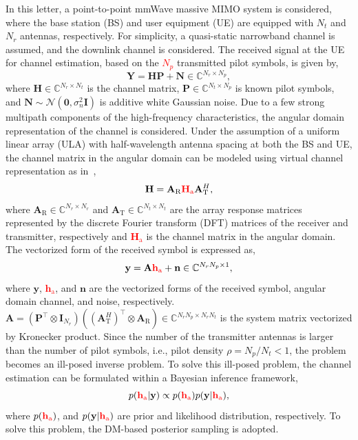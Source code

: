 \documentclass[lettersize,journal]{IEEEtran}
\newcommand{\tred}{\textcolor{red}}
\begin{document}
In this letter, a point-to-point mmWave massive MIMO system is considered, where the base station (BS) and user equipment (UE) are equipped with $N_{t}$ and $N_{r}$ antennas, respectively. For simplicity, a quasi-static narrowband channel is assumed, and the downlink channel is considered. The received signal at the UE for channel estimation, based on the \tred{$N_{p}$} transmitted pilot symbols, is given by,
\begin{equation}
\mathbf{Y}=\mathbf{H}\mathbf{P}+\mathbf{N}\in \mathbb{C}^{N_{r}\times N_{p}},
\end{equation}
where $\mathbf{H}\in \mathbb{C}^{N_{r}\times N_{t}}$ is the channel matrix, $\mathbf{P}\in \mathbb{C}^{N_{t}\times N_{p}}$ is known pilot symbols, and $\mathbf{N}\sim\mathcal{N}(\mathbf{0},\sigma^{2}_{n}\mathbf{I})$ is additive white Gaussian noise. Due to a few strong multipath components of the high-frequency characteristics, the angular domain representation of the channel is considered. Under the assumption of a uniform linear array (ULA) with half-wavelength antenna spacing at both the BS and UE, the channel matrix in the angular domain can be modeled using virtual channel representation as in~\cite{sayeedDeconstructingMultiantennaFading2002},
\begin{equation}
\mathbf{H} = \mathbf{A}_{\text{R}}\tred{\mathbf{H}_{\text{a}}}\mathbf{A}_{\text{T}}^{H},
\end{equation}
where $\mathbf{A}_{\text{R}}\in \mathbb{C}^{N_{r}\times N_{r}}$ and $\mathbf{A}_{\text{T}}\in \mathbb{C}^{N_{t}\times N_{t}}$ are the array response matrices represented by the discrete Fourier transform (DFT) matrices of the receiver and transmitter, respectively and \tred{$\mathbf{H}_{\text{a}}$ }is the channel matrix in the angular domain.
The vectorized form of the received symbol is expressed as,
\begin{equation}
\mathbf{y} = \mathbf{A}\tred{\mathbf{h}_{\text{a}}}+\mathbf{n}\in \mathbb{C}^{N_{r}N_{p}\times 1},
\end{equation}
where $\mathbf{y}$, \tred{$\mathbf{h}_{\text{a}}$}, and $\mathbf{n}$ are the vectorized forms of the received symbol, angular domain channel, and noise, respectively. $\mathbf{A}=(\mathbf{P}^{\top}\otimes\mathbf{I}_{N_{r}})((\mathbf{A}_{\text{T}}^{H})^{\top}\otimes \mathbf{A}_{\text{R}})\in \mathbb{C}^{N_{r}N_{p}\times N_{r}N_{t}}$ is the system matrix vectorized by Kronecker product.
Since the number of the transmitter antennas is larger than the number of pilot symbols, i.e., pilot density $\rho=N_{p}/N_{t}<1$, the problem becomes an ill-posed inverse problem.
To solve this ill-posed problem, the channel estimation can be formulated within a Bayesian inference framework,
\begin{equation}
  p(\tred{\mathbf{h}_{\text{a}}}|\mathbf{y})\propto p(\tred{\mathbf{h}_{\text{a}}})p(\mathbf{y}|\tred{\mathbf{h}_{\text{a}}}),
\end{equation}
where $p(\tred{\mathbf{h}_{\text{a}}})$, and $p(\mathbf{y}|\tred{\mathbf{h}_{\text{a}}})$ are prior and likelihood distribution, respectively. To solve this problem, the DM-based posterior sampling is adopted.
\end{document}

